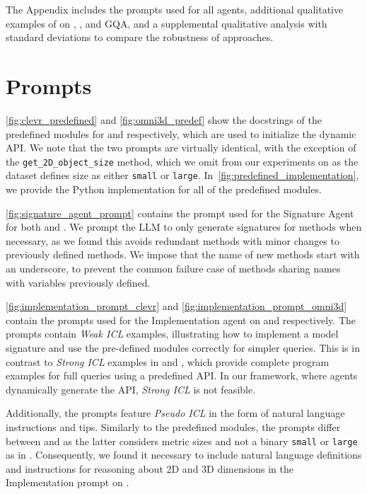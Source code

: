 \clearpage
\setcounter{page}{1}
\maketitlesupplementary

\appendix



The Appendix includes the prompts used for all agents, additional qualitative examples of \method on \clevr, \ourbench, and GQA, and a supplemental qualitative analysis with standard deviations to compare the robustness of approaches.

\section{Prompts}
 \cref{fig:clevr_predefined} and \cref{fig:omni3d_predef} show the docstrings of the predefined modules 
for \clevr and \ourbench respectively, which are used to initialize the dynamic API. We note that the two prompts are virtually identical, with the exception of the \texttt{get\_2D\_object\_size} method, which we omit from our experiments on \clevr as the dataset defines size as either \texttt{small} or \texttt{large}. In~\cref{fig:predefined_implementation}, we provide the Python implementation for all of the predefined modules.

 \cref{fig:signature_agent_prompt} contains the prompt used for the Signature Agent for both \clevr and \ourbench. We prompt the LLM to only generate signatures for methods when necessary, as we found this avoids redundant methods with minor changes to previously defined methods. We impose that the name of new methods start with an underscore, to prevent the common failure case of methods sharing names with variables previously defined. 

 \cref{fig:implementation_prompt_clevr} and \cref{fig:implementation_prompt_omni3d} contain the prompts used for the Implementation agent on \clevr and \ourbench respectively. The prompts contain \emph{Weak ICL} examples, illustrating how to implement a model signature and use the pre-defined modules correctly for simpler queries. This is in contrast to \emph{Strong ICL} examples in \visprog and \viper, which provide complete program examples for full queries using a predefined API. In our framework, where agents dynamically generate the API, \emph{Strong ICL} is not feasible. 

Additionally, the prompts feature \emph{Pseudo ICL} in the form of natural language instructions and tips. Similarly to the predefined modules, the prompts differ between \clevr and \ourbench as the latter considers metric sizes and not a binary \texttt{small} or \texttt{large} as in \clevr. Consequently, we found it necessary to include natural language definitions and instructions for reasoning about 2D and 3D dimensions in the Implementation prompt on \ourbench.

